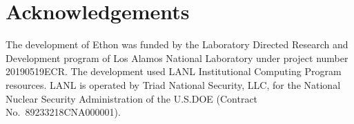 \documentclass{article}
\begin{document}
\section*{Acknowledgements}

The development of Ethon was funded by the Laboratory Directed
Research and Development program of Los Alamos National Laboratory under
project number 20190519ECR. The development used LANL Institutional Computing
Program resources. LANL is operated by Triad National Security, LLC, for the
National Nuclear Security Administration of the U.S.DOE (Contract No.\
89233218CNA000001).



\end{document}
